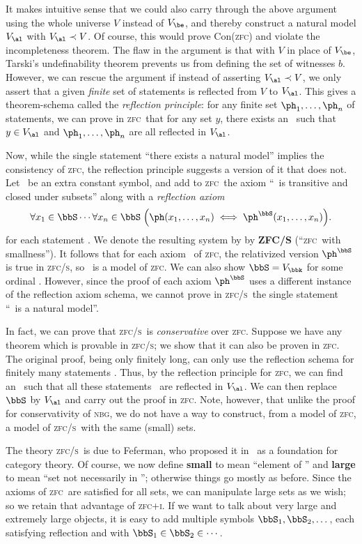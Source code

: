 \documentclass{amsart}
\let\ee\prec
\def\zfc{\textsc{zfc}}
\def\zfci{\textsc{zfc+i}}
\def\zfcs{\textsc{zfc/s}}
\def\nbg{\textsc{nbg}}
\begin{document}
It makes intuitive sense that we could also carry through the above
argument using the whole universe $V$ instead of $V_\be$, and thereby
construct a natural model $V_\al$ with $V_\al\ee V$.  Of course, this
would prove Con(\zfc) and violate the incompleteness theorem.  The
flaw in the argument is that with $V$ in place of $V_\be$, Tarski's
undefinability theorem prevents us from defining the set of witnesses
$b$.  However, we can rescue the argument if instead of asserting
$V_\al\ee V$, we only assert that a given \emph{finite} set of
statements is reflected from $V$ to $V_\al$.  This gives a
theorem-schema called the \emph{reflection principle}: for any finite
set $\ph_1,\dots,\ph_n$ of statements, we can prove in \zfc\ that for
any set $y$, there exists an \al\ such that $y\in V_\al$ and
$\ph_1,\dots,\ph_n$ are all reflected in $V_\al$.


Now, while the single statement ``there exists a natural model''
implies the consistency of \zfc, the reflection principle suggests a
version of it that does not.  Let \bbS\ be an extra constant symbol,
and add to \zfc\ the axiom ``\bbS\ is transitive and closed under
subsets'' along with a \emph{reflection axiom}
\[\forall x_1\in \bbS\cdots \forall x_n\in \bbS \;\Big( \ph(x_1,\dots,x_n)
\iff \ph^\bbS(x_1,\dots,x_n)\Big).
\]
for each statement \ph.  We denote the resulting system by by
\textbf{ZFC/S} (``\zfc\ with smallness'').  It follows that for each
axiom \ph\ of \zfc, the relativized version $\ph^\bbS$ is true in
\zfcs, so \bbS\ is a model of \zfc.  We can also show $\bbS=V_\bbk$
for some ordinal \bbk.  However, since the proof of each axiom
$\ph^\bbS$ uses a different instance of the reflection axiom schema,
we cannot prove in \zfcs\ the single statement ``\bbS\ is a natural
model''.

In fact, we can prove that \zfcs\ is \emph{conservative} over \zfc.
Suppose we have any theorem which is provable in \zfcs; we show that
it can also be proven in \zfc.  The original proof, being only
finitely long, can only use the reflection schema for finitely many
statements \ph.  Thus, by the reflection principle for \zfc, we can
find an \al\ such that all these statements \ph\ are reflected in
$V_\al$.  We can then replace $\bbS$ by $V_\al$ and carry out the
proof in \zfc.  Note, however, that unlike the proof for
conservativity of \nbg, we do not have a way to construct, from a
model of \zfc, a model of \zfcs\ with the same (small) sets.

The theory \zfcs\ is due to Feferman, who proposed it
in~\cite{feferman:fdns-of-ct} as a foundation for category theory.  Of
course, we now define \textbf{small} to mean ``element of \bbS'' and
\textbf{large} to mean ``set not necessarily in \bbS''; otherwise
things go mostly as before.  Since the axioms of \zfc\ are satisfied
for all sets, we can manipulate large sets as we wish; so we retain
that advantage of \zfci.  If we want to talk about very large and
extremely large objects, it is easy to add multiple symbols
$\bbS_1,\bbS_2,\dots$, each satisfying reflection and with
$\bbS_1\in\bbS_2\in\cdots$.
\end{document}
